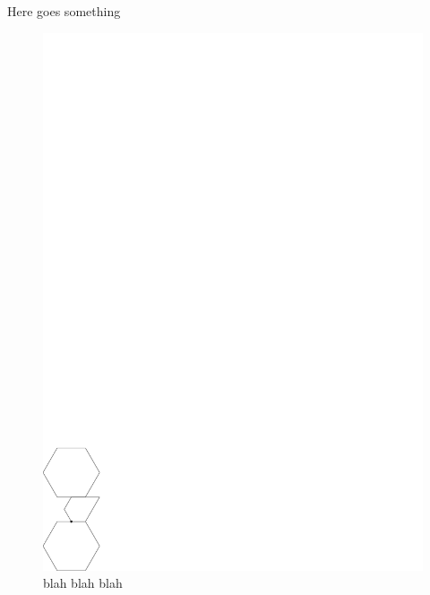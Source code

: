 
Here goes something
\begin{figure}[htbp]
\begin{center}
\includegraphics{graphics/RightSwitchBetweenTwoPolygons.pdf}
\caption{blah blah blah}
\end{center} 
\end{figure} 
